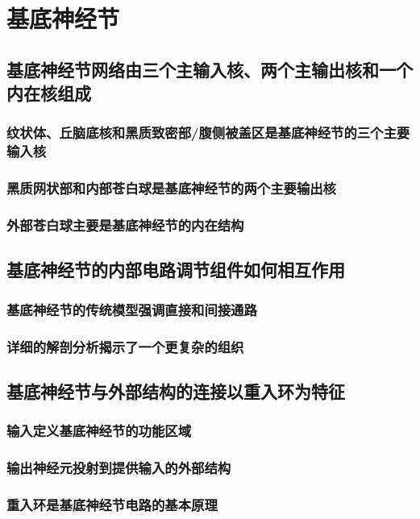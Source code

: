 \chapter{基底神经节}

\section{基底神经节网络由三个主输入核、两个主输出核和一个内在核组成}
\subsection{纹状体、丘脑底核和黑质致密部/腹侧被盖区是基底神经节的三个主要输入核}
\subsection{黑质网状部和内部苍白球是基底神经节的两个主要输出核}
\subsection{外部苍白球主要是基底神经节的内在结构}

\section{基底神经节的内部电路调节组件如何相互作用}
\subsection{基底神经节的传统模型强调直接和间接通路}
\subsection{详细的解剖分析揭示了一个更复杂的组织}

\section{基底神经节与外部结构的连接以重入环为特征}
\subsection{输入定义基底神经节的功能区域}
\subsection{输出神经元投射到提供输入的外部结构}
\subsection{重入环是基底神经节电路的基本原理}

